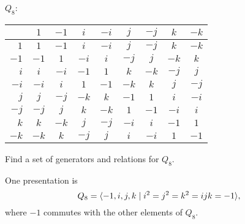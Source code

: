 \begin{solution}
  $Q_8$:
  \begin{center}
    \begin{tabular}{r|cccccccc}
      & $1$ & $-1$ & $i$ & $-i$ & $j$ & $-j$ & $k$ & $-k$ \\
      \hline
      $1$ & $1$ & $-1$ & $i$ & $-i$ & $j$ & $-j$ & $k$ & $-k$ \\
      $-1$ & $-1$ & $1$ & $-i$ & $i$ & $-j$ & $j$ & $-k$ & $k$ \\
      $i$ & $i$ & $-i$ & $-1$ & $1$ & $k$ & $-k$ & $-j$ & $j$ \\
      $-i$ & $-i$ & $i$ & $1$ & $-1$ & $-k$ & $k$ & $j$ & $-j$ \\
      $j$ & $j$ & $-j$ & $-k$ & $k$ & $-1$ & $1$ & $i$ & $-i$ \\
      $-j$ & $-j$ & $j$ & $k$ & $-k$ & $1$ & $-1$ & $-i$ & $i$ \\
      $k$ & $k$ & $-k$ & $j$ & $-j$ & $-i$ & $i$ & $-1$ & $1$ \\
      $-k$ & $-k$ & $k$ & $-j$ & $j$ & $i$ & $-i$ & $1$ & $-1$
    \end{tabular}
  \end{center}
\end{solution}

 Find a set of generators and relations for $Q_8$.
\begin{solution}
  One presentation is
  \begin{equation*}
    Q_8 = \langle{-1,i,j,k \mid i^2 = j^2 = k^2 = ijk = -1}\rangle,
  \end{equation*}
  where $-1$ commutes with the other elements of $Q_8$.
\end{solution}
